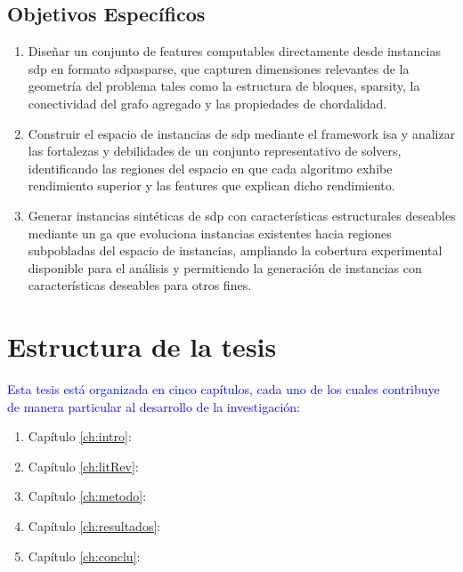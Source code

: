\subsection{Objetivos Específicos}%

\begin{enumerate}
    \item Diseñar un conjunto de \glspl{feature} computables directamente desde instancias
    \acrshort{sdp} en formato \gls{sdpasparse}, que capturen dimensiones relevantes
    de la geometría del problema tales como la estructura de bloques, \gls{sparsity}, la conectividad del grafo
    agregado y las propiedades de chordalidad.

    \item Construir el espacio de instancias de \acrshort{sdp} mediante el \gls{framework} \acrshort{isa} y
    analizar las fortalezas y debilidades de un conjunto representativo de \glspl{solver}, identificando las regiones
    del espacio en que cada algoritmo exhibe rendimiento superior y las \glspl{feature} que explican
    dicho rendimiento.

    \item Generar instancias sintéticas de \acrshort{sdp} con características estructurales deseables mediante
    un \acrfull{ga} que evoluciona instancias existentes hacia regiones subpobladas del espacio de instancias,
    ampliando la cobertura experimental disponible para el análisis y permitiendo la generación de instancias
    con características deseables para otros fines.
\end{enumerate}

\section{Estructura de la tesis}
\textcolor{blue}{Esta tesis está organizada en cinco capítulos, cada uno de los cuales contribuye de manera particular al desarrollo de la investigación:}
\begin{enumerate}
\item Capítulo \ref{ch:intro}:
\item Capítulo \ref{ch:litRev}:
\item Capítulo \ref{ch:metodo}:
\item Capítulo \ref{ch:resultados}:
\item Capítulo \ref{ch:conclu}:
\end{enumerate}
